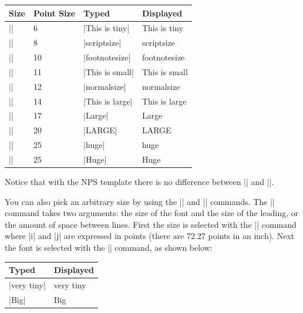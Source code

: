 \begin{center}
\begin{tabular}{llll}
Size          & Point Size & Typed & Displayed  \\\hline
|\tiny|       &  6 & |{\tiny This is tiny}| & {\tiny This is tiny}\\
|\scriptsize| &  8 & |{\scriptsize scriptsize}| & {\scriptsize scriptsize} \\
|\footnotesize| & 10 & |{\footnotesize footnotesize}| & {\footnotesize footnotesize} \\
|\small|        & 11 & |{\small This is small}| & {\small This is small} \\
|\normalsize|   & 12 & |{\normalsize normalsize}| & {\normalsize  normalsize} \\
|\large|        & 14 & |{\large This is large}| & {\large This is large} \\
|\Large|        & 17 & |{\Large Large}| & {\Large Large} \\
|\LARGE|        & 20 & |{\LARGE LARGE}| & {\LARGE LARGE} \\
|\huge|         & 25 & |{\huge huge}| & {\huge huge} \\
|\Huge|         & 25 & |{\Huge Huge}| & {\Huge Huge} \\
\end{tabular}
\end{center}

Notice that with the NPS template there is no difference between
|\huge| and |\Huge|.

You can also pick an arbitrary size by using the |\fontsize| and |\selectfont|
commands. The |\fontsize| command takes two arguments: the size of the font and
the size of the leading, or the amount of space between lines. First the size
is selected with the |\fontsize{i}{j}| command where |i| and |j| are expressed
in points (there are 72.27 points in an inch). Next the font is selected with
the |\selectfont| command, as shown below:

\begin{center}
\begin{tabular}{l|l}
Typed & Displayed  \\\hline
|{\fontsize{4}{5}\selectfont very tiny}|& {\fontsize{4}{5}\selectfont very tiny}\\
|{\fontsize{64}{64}\selectfont Big}|& {\fontsize{64}{64}\selectfont Big}\\
\end{tabular}
\end{center}


